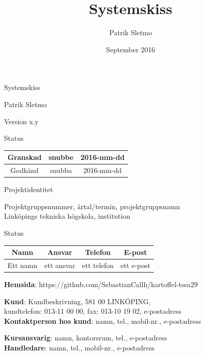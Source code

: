\documentclass{article}
\title{Systemskiss}
\author{Patrik Sletmo}
\date{September 2016}
\begin{document}
\thispagestyle{empty}

{
\sffamily
\centering
\large


{\huge 
Systemskiss
}

{\large
Patrik Sletmo
}

{\large
Version x.y
}

\vspace{3.5cm}

Status
\begin{center}
\begin{tabular}{ | c | c | c | } 
\hline
Granskad & snubbe & 2016-mm-dd \\
\hline
Godkänd & snubba & 2016-mm-dd\\
\hline
\end{tabular}
\end{center}
}

\clearpage

{
\sffamily
\centering
\large


{\huge 
Projektidentitet
}

{\large
Projektgruppsnummer, årtal/termin, projektgruppsnamn \\ Linköpings tekniska högskola, institution 
}

\vspace{3.5cm}

Status
\begin{center}
\begin{tabular}{ | c | c | c | c |} 
\hline
Namn & Ansvar & Telefon & E-post \\  
\hline
Ett namn & ett ansvar & ett telefon & ett e-post \\
\hline
\end{tabular}
\end{center}
}

\begin{center}
\textbf{Hemsida}: https://github.com/SebastianCallh/kartoffel-tsea29
\end{center}

\begin{center}
\textbf{Kund}: Kundbeskrivning, 581 00 LINKÖPING, \\
kundtelefon: 013-11 00 00, fax: 013-10 19 02, e-postadress \\
\textbf{Kontaktperson hos kund}: namn, tel., mobil-nr., e-postadress 
\end{center}

\begin{center}
\textbf{Kursansvarig}: namn, kontorsrum, tel., e-postadress \\
\textbf{Handledare}: namn, tel., mobil-nr., e-postadress 
\end{center}
\clearpage
\end{document}
